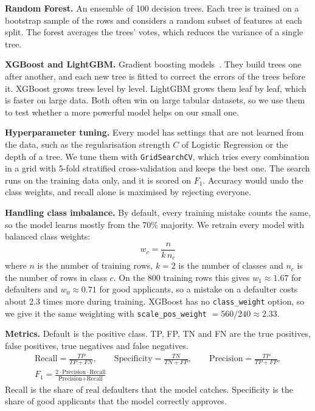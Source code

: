 \documentclass[11pt,a4paper]{article}
\begin{document}
\textbf{Random Forest.} An ensemble of 100 decision trees. Each tree is trained on a bootstrap sample of the rows and considers a random subset of features at each split. The forest averages the trees' votes, which reduces the variance of a single tree.

\textbf{XGBoost and LightGBM.} Gradient boosting models~\cite{xgboost,lightgbm}. They build trees one after another, and each new tree is fitted to correct the errors of the trees before it. XGBoost grows trees level by level. LightGBM grows them leaf by leaf, which is faster on large data. Both often win on large tabular datasets, so we use them to test whether a more powerful model helps on our small one.

\textbf{Hyperparameter tuning.} Every model has settings that are not learned from the data, such as the regularisation strength $C$ of Logistic Regression or the depth of a tree. We tune them with \texttt{GridSearchCV}, which tries every combination in a grid with 5-fold stratified cross-validation and keeps the best one. The search runs on the training data only, and it is scored on $F_1$. Accuracy would undo the class weights, and recall alone is maximised by rejecting everyone.

\textbf{Handling class imbalance.} By default, every training mistake counts the same, so the model learns mostly from the 70\% majority. We retrain every model with balanced class weights:
\begin{equation}
  w_c = \frac{n}{k\,n_c}
\end{equation}
where $n$ is the number of training rows, $k = 2$ is the number of classes and $n_c$ is the number of rows in class $c$. On the 800 training rows this gives $w_1 \approx 1.67$ for defaulters and $w_0 \approx 0.71$ for good applicants, so a mistake on a defaulter costs about 2.3 times more during training. XGBoost has no \texttt{class\_weight} option, so we give it the same weighting with \texttt{scale\_pos\_weight} $= 560/240 \approx 2.33$.

\textbf{Metrics.} Default is the positive class. TP, FP, TN and FN are the true positives, false positives, true negatives and false negatives.
\begin{gather}
  \text{Recall} = \frac{TP}{TP+FN}, \qquad
  \text{Specificity} = \frac{TN}{TN+FP}, \qquad
  \text{Precision} = \frac{TP}{TP+FP}, \\
  F_1 = \frac{2 \cdot \text{Precision} \cdot \text{Recall}}{\text{Precision} + \text{Recall}}
\end{gather}
Recall is the share of real defaulters that the model catches. Specificity is the share of good applicants that the model correctly approves.
\end{document}
